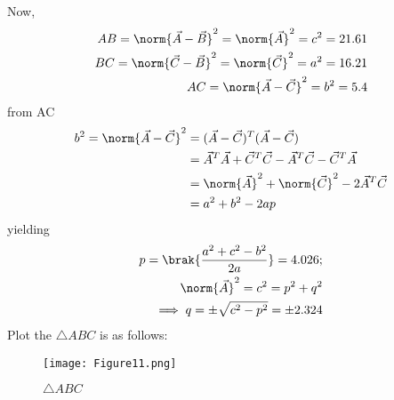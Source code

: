 \documentclass[journal,12pt,twocolumn]{IEEEtran}
\begin{document}
Now,
\begin{align}
AB=\norm{\vec{A}-\vec{B}}^2 = \norm{\vec{A}}^2  = c^2 =21.61
\\
BC=\norm{\vec{C}-\vec{B}}^2 = \norm{\vec{C}}^2 =a^2=16.21
\\
AC=\norm{\vec{A}-\vec{C}}^2 = b^2=5.4
\end{align}
from AC 
\begin{align}
b^2=\norm{\vec{A}-\vec{C}}^2&=({\vec{A}-\vec{C}})^T({\vec{A}-\vec{C}})
\\
&= \vec{A}^T\vec{A}+\vec{C}^T\vec{C}-\vec{A}^T\vec{C} - \vec{C}^T\vec{A}
\\
&= \norm{\vec{A}}^2 + \norm{\vec{C}}^2 - 2\vec{A}^T\vec{C}
\\
&= a^2 + b^2-2ap
\end{align}
yielding
\\
\begin{align}
p=\brak{\frac{a^2+c^2-b^2}{2a}}=4.026;
\\
\norm{\vec{A}}^2 =c^2=p^2+q^2
\\
\implies q=\pm{\sqrt{c^2-p^2}}=\pm{2.324}
\end{align}
Plot the $\triangle ABC$ is as follows:
\begin{figure}[h!]
\centering
\texttt{[image: Figure11.png]}
\caption{$\triangle ABC$}
\label{fig:$\triangle ABC$}
\end{figure}
\end{document}
